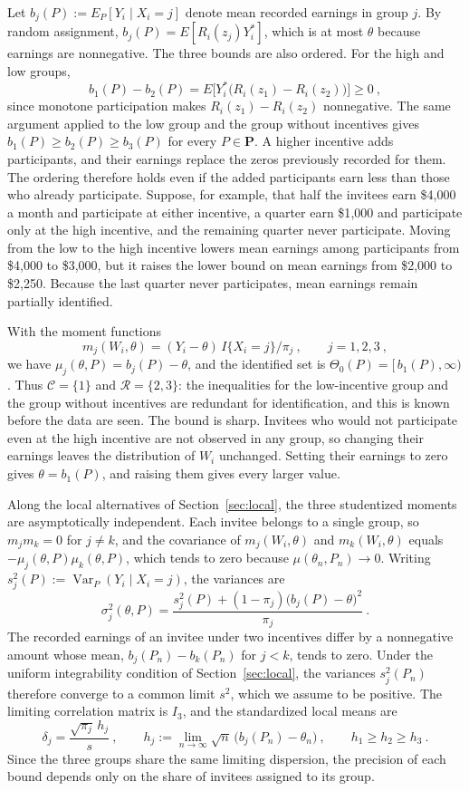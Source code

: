 \documentclass[11pt]{article}
\numberwithin{equation}{section}
\theoremstyle{definition}
\begin{document}
Let $b_j(P):=E_P[Y_i\mid X_i=j]$ denote mean recorded earnings in group $j$. By random assignment, $b_j(P)=E[R_i(z_j)Y_i^*]$, which is at most $\theta$ because earnings are nonnegative. The three bounds are also ordered. For the high and low groups,
\begin{equation}\label{eq:incentive-order}
b_1(P)-b_2(P)=E\big[Y_i^*\big(R_i(z_1)-R_i(z_2)\big)\big]\ge0~,
\end{equation}
since monotone participation makes $R_i(z_1)-R_i(z_2)$ nonnegative. The same argument applied to the low group and the group without incentives gives $b_1(P)\ge b_2(P)\ge b_3(P)$ for every $P\in\mathbf P$. A higher incentive adds participants, and their earnings replace the zeros previously recorded for them. The ordering therefore holds even if the added participants earn less than those who already participate. Suppose, for example, that half the invitees earn \$4{,}000 a month and participate at either incentive, a quarter earn \$1{,}000 and participate only at the high incentive, and the remaining quarter never participate. Moving from the low to the high incentive lowers mean earnings among participants from \$4{,}000 to \$3{,}000, but it raises the lower bound on mean earnings from \$2{,}000 to \$2{,}250. Because the last quarter never participates, mean earnings remain partially identified.

With the moment functions
\[
m_j(W_i,\theta)=(Y_i-\theta)\,I\{X_i=j\}/\pi_j~,\qquad j=1,2,3~,
\]
we have $\mu_j(\theta,P)=b_j(P)-\theta$, and the identified set is $\Theta_0(P)=[\,b_1(P),\infty)$. Thus $\mathcal C=\{1\}$ and $\mathcal R=\{2,3\}$: the inequalities for the low-incentive group and the group without incentives are redundant for identification, and this is known before the data are seen. The bound is sharp. Invitees who would not participate even at the high incentive are not observed in any group, so changing their earnings leaves the distribution of $W_i$ unchanged. Setting their earnings to zero gives $\theta=b_1(P)$, and raising them gives every larger value.

Along the local alternatives of Section~\ref{sec:local}, the three studentized moments are asymptotically independent. Each invitee belongs to a single group, so $m_jm_k=0$ for $j\ne k$, and the covariance of $m_j(W_i,\theta)$ and $m_k(W_i,\theta)$ equals $-\mu_j(\theta,P)\mu_k(\theta,P)$, which tends to zero because $\mu(\theta_n,P_n)\to0$. Writing $s_j^2(P):=\operatorname{Var}_P(Y_i\mid X_i=j)$, the variances are
\[
\sigma_j^2(\theta,P)=\frac{s_j^2(P)+(1-\pi_j)\big(b_j(P)-\theta\big)^2}{\pi_j}~.
\]
The recorded earnings of an invitee under two incentives differ by a nonnegative amount whose mean, $b_j(P_n)-b_k(P_n)$ for $j<k$, tends to zero. Under the uniform integrability condition of Section~\ref{sec:local}, the variances $s_j^2(P_n)$ therefore converge to a common limit $s^2$, which we assume to be positive. The limiting correlation matrix is $I_3$, and the standardized local means are
\[
\delta_j=\frac{\sqrt{\pi_j}\,h_j}{s}~,\qquad h_j:=\lim_{n\to\infty}\sqrt n\,\big(b_j(P_n)-\theta_n\big)~,\qquad h_1\ge h_2\ge h_3~.
\]
Since the three groups share the same limiting dispersion, the precision of each bound depends only on the share of invitees assigned to its group.
\end{document}
